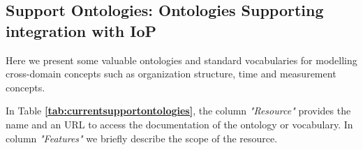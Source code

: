 \documentclass{guideline/sty/rapport}
\begin{document}
\subsection{Support Ontologies: Ontologies Supporting integration with IoP}
\label{sec:supportontologies}

Here we present some valuable ontologies and standard vocabularies for modelling cross-domain concepts such as organization structure, time and measurement concepts. \singlespacing

In Table \textbf{\ref{tab:currentsupportontologies}}, the column \textit{"Resource"} provides the name and an URL to access the documentation of the ontology or vocabulary. In column \textit{"Features"} we briefly describe the scope of the resource.
\end{document}
